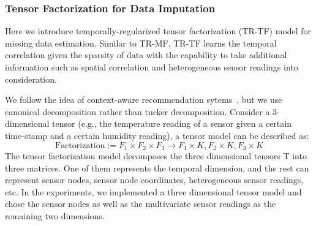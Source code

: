 \subsubsection{Tensor Factorization for Data Imputation} \label{sec:tfmissing}


Here we introduce temporally-regularized tensor factorization (TR-TF) model for missing data estimation. 
Similar to TR-MF, TR-TF learns the temporal correlation given the sparsity of data with the capability to take additional information such as spatial correlation and heterogeneous sensor readings into consideration.

We follow the idea of context-aware recommendation sytems~\cite{karatzoglou2010multiverse}, but we use canonical decomposition rather than tucker decomposition.
Consider a 3-dimensional tensor (e.g., the temperature reading of a sensor given a certain time-stamp and a certain humidity reading), a tensor model can be described as:
\begin{equation*}
\mbox{Factorization} :=  F_1 \times  F_2 \times F_3 \rightarrow F_1 \times K, F_2 \times K, F_3 \times K
\end{equation*}
The tensor factorization model decomposes the three dimensional tensors T into three matrices. One of them represents the temporal dimension, and the rest can represent sensor nodes, sensor node coordinates, heterogeneous sensor readings, etc. In the experiments, we implemented a three dimensional tensor model and chose the sensor nodes as well as the multivariate sensor readings as the remaining two dimensions.

